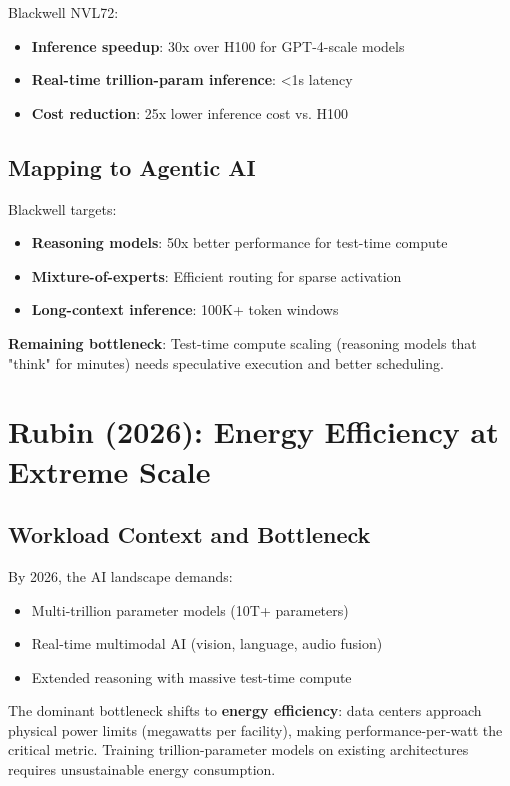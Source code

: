 \documentclass{article}
\begin{document}
Blackwell NVL72:
\begin{itemize}
\item \textbf{Inference speedup}: 30x over H100 for GPT-4-scale models
\item \textbf{Real-time trillion-param inference}: <1s latency
\item \textbf{Cost reduction}: 25x lower inference cost vs. H100
\end{itemize}

\subsection{Mapping to Agentic AI}

Blackwell targets:
\begin{itemize}
\item \textbf{Reasoning models}: 50x better performance for test-time compute
\item \textbf{Mixture-of-experts}: Efficient routing for sparse activation
\item \textbf{Long-context inference}: 100K+ token windows
\end{itemize}

\textbf{Remaining bottleneck}: Test-time compute scaling (reasoning models that "think" for minutes) needs speculative execution and better scheduling.

\section{Rubin (2026): Energy Efficiency at Extreme Scale}

\subsection{Workload Context and Bottleneck}

By 2026, the AI landscape demands:
\begin{itemize}
\item Multi-trillion parameter models (10T+ parameters)
\item Real-time multimodal AI (vision, language, audio fusion)
\item Extended reasoning with massive test-time compute
\end{itemize}

The dominant bottleneck shifts to \textbf{energy efficiency}: data centers approach physical power limits (megawatts per facility), making performance-per-watt the critical metric. Training trillion-parameter models on existing architectures requires unsustainable energy consumption.
\end{document}
